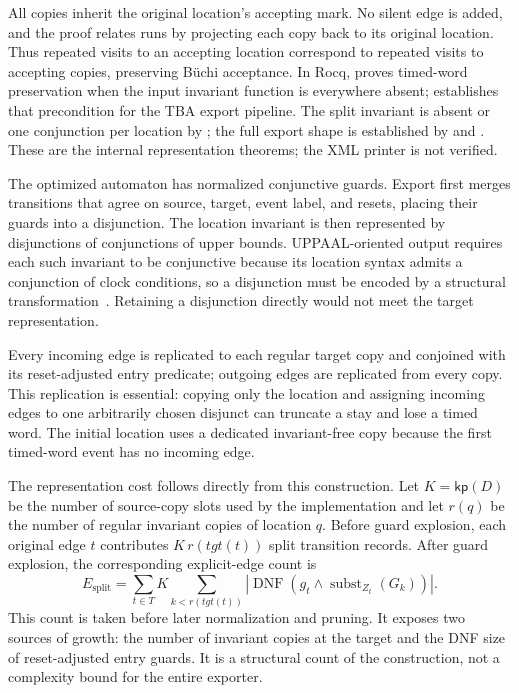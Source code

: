 All copies inherit the original location's accepting mark. No silent edge is
added, and the proof relates runs by projecting each copy back to its
original location. Thus repeated visits to an accepting location correspond
to repeated visits to accepting copies, preserving B\"uchi acceptance. In
Rocq,  proves timed-word preservation when the input
invariant function is everywhere absent;  establishes that
precondition for the TBA export pipeline. The split invariant is absent or
one conjunction per location by ; the full
export shape is established by  and
. These are the internal
representation theorems; the XML printer is not verified.

The optimized automaton has normalized conjunctive guards. Export first merges transitions that agree on source, target, event label, and resets, placing their guards into a disjunction. The location invariant is then represented by disjunctions of conjunctions of upper bounds. UPPAAL-oriented output requires each such invariant to be conjunctive because its location syntax admits a conjunction of clock conditions, so a disjunction must be encoded by a structural transformation~\cite{[BGD04]}. Retaining a disjunction directly would not meet the target representation.

Every incoming edge is replicated to each regular target copy and conjoined with its reset-adjusted entry predicate; outgoing edges are replicated from every copy. This replication is essential: copying only the location and assigning incoming edges to one arbitrarily chosen disjunct can truncate a stay and lose a timed word. The initial location uses a dedicated invariant-free copy because the first timed-word event has no incoming edge.

The representation cost follows directly from this construction. Let
$K=\mathsf{kp}(D)$ be the number of source-copy slots used by the
implementation and let $r(q)$ be the number of regular invariant copies of
location $q$. Before guard explosion, each original edge $t$ contributes
$K\,r(\mathit{tgt}(t))$ split transition records. After guard explosion,
the corresponding explicit-edge count is
\[
 E_{\mathrm{split}}=\sum_{t\in T}K\sum_{k<r(\mathit{tgt}(t))}
 \left|\operatorname{DNF}\!\left(g_t\land
   \operatorname{subst}_{Z_t}(G_k)\right)\right|.
\]
This count is taken before later normalization and pruning. It exposes two
sources of growth: the number of invariant copies at the target and the DNF
size of reset-adjusted entry guards. It is a structural count of the
construction, not a complexity bound for the entire exporter.

